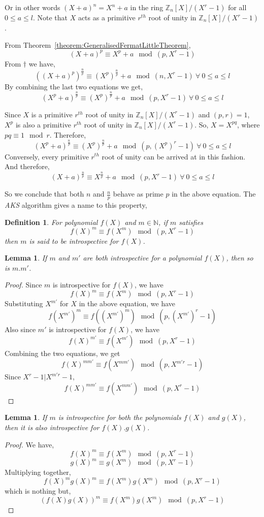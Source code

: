 \documentclass[11pt]{report}
\newtheorem{lemma}[theorem]{Lemma}
\newtheorem{definition}{Definition}[section]
\begin{document}
Or in other words $(X+a)^n = X^n + a$ in the ring $\mathbb{Z}_n[X]/(X^r-1)$ for all $0 \leq a \leq l$. Note that $X$ acts as a primitive $r^{th}$ root of unity in $\mathbb{Z}_n[X]/(X^r-1)$.

From Theorem~\ref{theorem:GeneralisedFermatLittleTheorem},
\[(X+a)^p \equiv X^p + a \mod (p,X^r-1)\]
From $\dagger$ we have, 
\[((X+a)^p)^{\frac{n}{p}} \equiv (X^p)^{\frac{n}{p}} + a \mod (n, X^r - 1)\ \forall\ 0 \leq a \leq l \]
By combining the last two equations we get,
\[(X^p+a)^{\frac{n}{p}} \equiv (X^p)^{\frac{n}{p}} + a \mod (p, X^r - 1)\ \forall\ 0 \leq a \leq l \]

Since $X$ is a primitive $r^{th}$ root of unity in $\mathbb{Z}_n[X]/(X^r-1)$ and $(p,r) = 1$, $X^p$ is also a primitive $r^{th}$ root of unity in $\mathbb{Z}_n[X]/(X^r-1)$. So, $X = X^{pq}$, where $pq \equiv 1 \mod r$. Therefore,
\[(X^p+a)^{\frac{n}{p}} \equiv (X^p)^{\frac{n}{p}} + a \mod (p, (X^p)^r - 1)\ \forall\ 0 \leq a \leq l \] Conversely, every primitive $r^{th}$ root of unity can be arrived at in this fashion. And therefore,
\[(X+a)^{\frac{n}{p}} \equiv X^{\frac{n}{p}} + a \mod (p, X^r - 1)\ \forall\ 0 \leq a \leq 
l \]

So we conclude that both $n$ and $\frac{n}{p}$ behave as prime $p$ in the above equation. The \emph{AKS} algorithm gives a name to this property,

\begin{definition}
\label{definition:introspective}
For polynomial $f(X)$ and $m \in \mathbb{N}$, if $m$ satisfies
\[f(X)^m \equiv f(X^m) \mod (p,X^r-1)\]
then $m$ is said to be introspective for $f(X)$.
\end{definition}

\begin{lemma}
\label{lemma:IntrospectiveLemma1}
If $m$ and $m'$ are both introspective for a polynomial $f(X)$, then so is $m . m'$.
\end{lemma}
\begin{proof}
Since $m$ is introspective for $f(X)$, we have
\[f(X)^m \equiv f(X^m) \mod (p, X^r-1)\]
Substituting $X^{m'}$ for $X$ in the above equation, we have
\[f(X^{m'})^m \equiv f((X^{m'})^m) \mod (p, (X^{m'})^r-1)\]
Also since $m'$ is introspective for $f(X)$, we have
\[f(X)^{m'} \equiv f(X^{m'}) \mod (p, X^r-1)\]
Combining the two equations, we get
\[f(X)^{mm'} \equiv f(X^{mm'}) \mod (p, X^{m'r}-1)\]
Since $X^{r}-1 | X^{m'r}-1$,
\[f(X)^{mm'} \equiv f(X^{mm'}) \mod (p, X^r-1)\]
\end{proof}
\begin{lemma}
\label{lemma:IntrospectiveLemma2}
If $m$ is introspective for both the polynomials $f(X)$ and $g(X)$, then it is also introspective for $f(X) . g(X)$.
\end{lemma}
\begin{proof}
We have,
\[f(X)^m \equiv f(X^m) \mod (p, X^r-1)\]
\[g(X)^m \equiv g(X^m) \mod (p, X^r-1)\]
Multiplying together,
\[f(X)^mg(X)^m \equiv f(X^m)g(X^m) \mod (p, X^r-1)\]
which is nothing but,
\[(f(X)g(X))^m \equiv f(X^m)g(X^m) \mod (p, X^r-1)\]
\end{proof}
\end{document}
